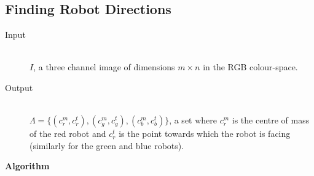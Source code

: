 \documentclass[10pt,a4paper]{article}
\begin{document}
\subsection{Finding Robot Directions}\label{directionalgo}
\begin{description}
\item[Input] \hfill \\
    $I$, a three channel image of dimensions $m \times n$ in the RGB colour-space.
\item[Output] \hfill \\
    $\Lambda = \{(c^m_r, c^t_r), (c^m_g, c^t_g), (c^m_b, c^t_b)\}$, a set where
    $c^m_r$ is the centre of mass of the red robot and $c^t_r$ is the point 
    towards which the robot is facing (similarly for the green and blue robots).
\end{description}
\textbf{Algorithm}
\end{document}
